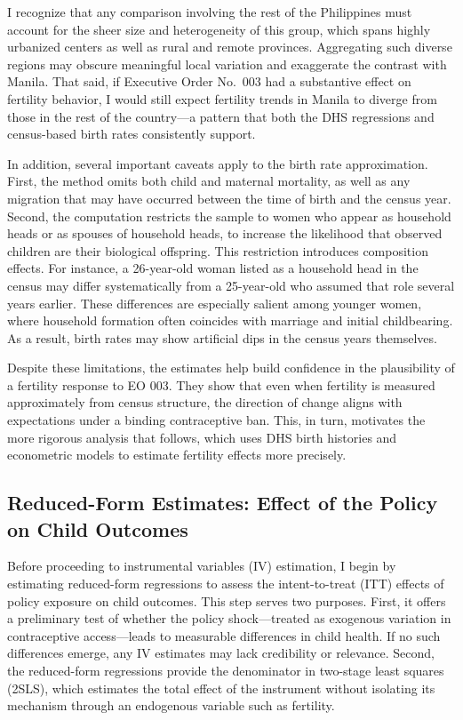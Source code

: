 \documentclass[]{AEA}
\begin{document}
I recognize that any comparison involving the rest of the Philippines
must account for the sheer size and heterogeneity of this group, which
spans highly urbanized centers as well as rural and remote provinces.
Aggregating such diverse regions may obscure meaningful local variation
and exaggerate the contrast with Manila. That said, if Executive Order
No.~003 had a substantive effect on fertility behavior, I would still
expect fertility trends in Manila to diverge from those in the rest of
the country---a pattern that both the DHS regressions and census-based
birth rates consistently support.

In addition, several important caveats apply to the birth rate
approximation. First, the method omits both child and maternal
mortality, as well as any migration that may have occurred between the
time of birth and the census year. Second, the computation restricts the
sample to women who appear as household heads or as spouses of household
heads, to increase the likelihood that observed children are their
biological offspring. This restriction introduces composition effects.
For instance, a 26-year-old woman listed as a household head in the
census may differ systematically from a 25-year-old who assumed that
role several years earlier. These differences are especially salient
among younger women, where household formation often coincides with
marriage and initial childbearing. As a result, birth rates may show
artificial dips in the census years themselves.

Despite these limitations, the estimates help build confidence in the
plausibility of a fertility response to EO 003. They show that even when
fertility is measured approximately from census structure, the direction
of change aligns with expectations under a binding contraceptive ban.
This, in turn, motivates the more rigorous analysis that follows, which
uses DHS birth histories and econometric models to estimate fertility
effects more precisely.

\subsection{Reduced-Form Estimates: Effect of the Policy on Child Outcomes}

Before proceeding to instrumental variables (IV) estimation, I begin by
estimating reduced-form regressions to assess the intent-to-treat (ITT)
effects of policy exposure on child outcomes. This step serves two
purposes. First, it offers a preliminary test of whether the policy
shock---treated as exogenous variation in contraceptive access---leads
to measurable differences in child health. If no such differences
emerge, any IV estimates may lack credibility or relevance. Second, the
reduced-form regressions provide the denominator in two-stage least
squares (2SLS), which estimates the total effect of the instrument
without isolating its mechanism through an endogenous variable such as
fertility.
\end{document}
